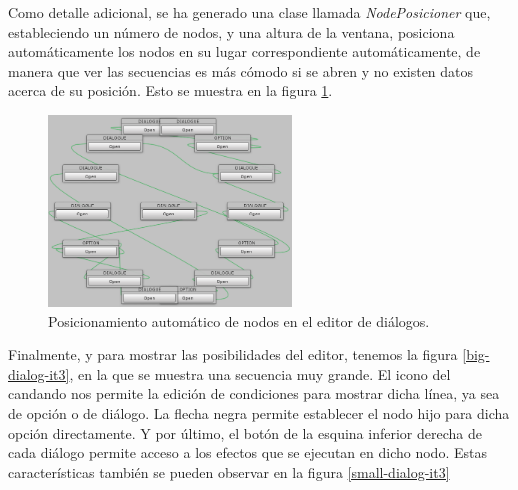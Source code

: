 Como detalle adicional, se ha generado una clase llamada \textit{NodePosicioner} que, estableciendo un número de nodos, y una altura de la ventana, posiciona automáticamente los nodos en su lugar correspondiente automáticamente, de manera que ver las secuencias es más cómodo si se abren y no existen datos acerca de su posición. Esto se muestra en la figura \ref{circle-nodes-it3}.

\begin{figure}[h!]
	\centerline{\includegraphics[height=2in]{figures/it3/nodes-circle.png}}
	\caption[Anillo de nodos - Editor de Diálogos]{Posicionamiento automático de nodos en el editor de diálogos.}
	\label{circle-nodes-it3}
\end{figure}

Finalmente, y para mostrar las posibilidades del editor, tenemos la figura \ref{big-dialog-it3}, en la que se muestra una secuencia muy grande. El icono del candando nos permite la edición de condiciones para mostrar dicha línea, ya sea de opción o de diálogo. La flecha negra permite establecer el nodo hijo para dicha opción directamente. Y por último, el botón de la esquina inferior derecha de cada diálogo permite acceso a los efectos que se ejecutan en dicho nodo. Estas características también se pueden observar en la figura \ref{small-dialog-it3}


